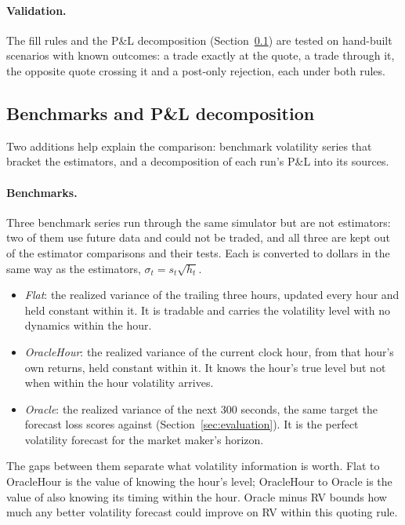 \documentclass[11pt]{article}
\begin{document}
\paragraph{Validation.}
The fill rules and the P\&L decomposition (Section~\ref{sec:benchmarks}) are tested on hand-built
scenarios with known outcomes: a trade exactly at the quote, a trade through it, the opposite quote
crossing it and a post-only rejection, each under both rules.

\subsection{Benchmarks and P\&L decomposition}
\label{sec:benchmarks}

Two additions help explain the comparison: benchmark volatility series that bracket the estimators,
and a decomposition of each run's P\&L into its sources.

\paragraph{Benchmarks.}
Three benchmark series run through the same simulator but are not estimators: two of them use future
data and could not be traded, and all three are kept out of the estimator comparisons and their tests.
Each is converted to dollars in the same way as the estimators, $\sigma_t = s_t\sqrt{h_t}$.
\begin{itemize}
  \item \emph{Flat}: the realized variance of the trailing three hours, updated every hour and held
    constant within it. It is tradable and carries the volatility level with no dynamics within the hour.
  \item \emph{OracleHour}: the realized variance of the current clock hour, from that hour's own
    returns, held constant within it. It knows the hour's true level but not when within the hour
    volatility arrives.
  \item \emph{Oracle}: the realized variance of the next 300 seconds, the same target the forecast
    loss scores against (Section~\ref{sec:evaluation}). It is the perfect volatility forecast for the
    market maker's horizon.
\end{itemize}
The gaps between them separate what volatility information is worth. Flat to OracleHour is the value of
knowing the hour's level; OracleHour to Oracle is the value of also knowing its timing within the hour.
Oracle minus RV bounds how much any better volatility forecast could improve on RV within this quoting
rule.
\end{document}
